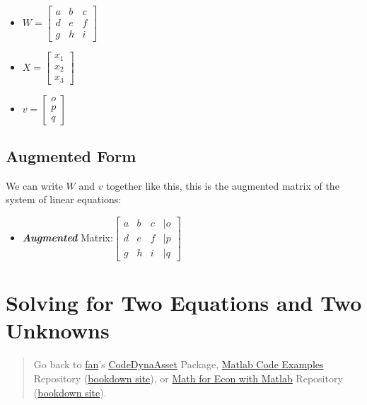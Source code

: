 \documentclass[
]{book}
\providecommand{\tightlist}{%
  \setlength{\itemsep}{0pt}\setlength{\parskip}{0pt}}
\begin{document}
\begin{itemize}
\item
  \(\displaystyle W=\left\lbrack \begin{array}{ccc} a & b & c\\ d & e & f\\ g & h & i \end{array}\right\rbrack\)
\item
  \(\displaystyle {X}=\left\lbrack \begin{array}{c} x_1 \\ x_2 \\ x_3 \end{array}\right\rbrack\)
\item
  \(\displaystyle v=\left\lbrack \begin{array}{c} o\\ p\\ q \end{array}\right\rbrack\)
\end{itemize}

\hypertarget{augmented-form}{%
\subsection{Augmented Form}\label{augmented-form}}

We can write \(W\) and \(v\) together like this, this is the augmented
matrix of the system of linear equations:

\begin{itemize}
\tightlist
\item
  \textbf{\emph{Augmented}} Matrix:\(\left\lbrack \begin{array}{cccc} a & b & c & |o\\ d & e & f & |p\\ g & h & i & |q \end{array}\right\rbrack\)
\end{itemize}

\hypertarget{solving-for-two-equations-and-two-unknowns}{%
\section{Solving for Two Equations and Two Unknowns}\label{solving-for-two-equations-and-two-unknowns}}

\begin{quote}
Go back to \href{http://fanwangecon.github.io/}{fan}'s \href{https://fanwangecon.github.io/CodeDynaAsset/}{CodeDynaAsset} Package, \href{https://fanwangecon.github.io/M4Econ/}{Matlab Code Examples} Repository (\href{https://fanwangecon.github.io/M4Econ/bookdown}{bookdown site}), or \href{https://fanwangecon.github.io/Math4Econ/}{Math for Econ with Matlab} Repository (\href{https://fanwangecon.github.io/Math4Econ/bookdown}{bookdown site}).
\end{quote}
\end{document}
